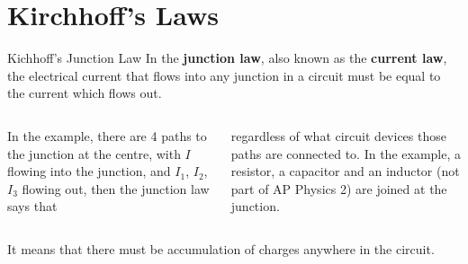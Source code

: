 \documentclass[12pt,aspectratio=169]{beamer}
\begin{document}
\section{Kirchhoff's Laws}

\begin{frame}{Kichhoff's Junction Law}
  In the \textbf{junction law}, also known as the \textbf{current law}, the
  electrical current that flows into any junction in a circuit must
  be equal to the current which flows out.

  \vspace{.05in}
  \begin{columns}[T]
    \centering
    
    In the example, there are 4 paths to the junction at the centre, with $I$
    flowing into the junction, and $I_1$, $I_2$, $I_3$ flowing out, then the
    junction law says that


    \vspace{-.18in}regardless of what circuit devices those paths are connected
    to. In the example, a resistor, a capacitor and an inductor (not part of AP
    Physics 2) are joined at the junction.
  \end{columns}
  \vspace{.13in}It means that there must be accumulation of charges
  anywhere in the circuit.
\end{frame}
\end{document}
